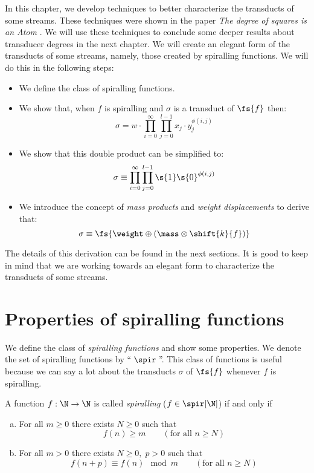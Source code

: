 
In this chapter, we develop techniques to better characterize the transducts of some streams. These techniques were shown in the paper \textit{The degree of squares is an Atom} \cite{streams:degrees:squares:2015}. We will use these techniques to conclude some deeper results about transducer degrees in the next chapter. We will create an elegant form of the transducts of some streams, namely, those created by spiralling functions. We will do this in the following steps:
\begin{itemize}
	\item We define the class of spiralling functions.
	\item We show that, when $f$ is spiralling and $\sigma$ is a transduct of $\fs{f}$ then:
	$$\sigma = w\cdot \prod_{i=0}^{\infty}\prod_{j=0}^{l-1} x_j \cdot y_j^{\phi(i,j)}$$
	\item We show that this double product can be simplified to:
	$$\sigma \equiv \prod_{i=0}^{\infty}\prod_{j=0}^{l-1} \s{1}\s{0}^{\phi(i,j)}$$
	\item We introduce the concept of \textit{mass products} and \textit{weight displacements} to derive that:
	$$\sigma \equiv \fs{\weight\oplus(\mass\otimes \shift{k}{f})}$$
\end{itemize}

The details of this derivation can be found in the next sections. It is good to keep in mind that we are working towards an elegant form to characterize the transducts of some streams.

\section{Properties of spiralling functions}
We define the class of \textit{spiralling functions} and show some properties. We denote the set of spiralling functions by ``$\;\spir\;$''. This class of functions is useful because we can say a lot about the transducts $\sigma$ of $\fs{f}$ whenever $f$ is spiralling. 

\begin{definition}\label{def_spir}
	A function $f: \N \to \N$ is called \textit{spiralling} ($f \in \spir[\N]$) if and only if
	\begin{enumerate}[(a)]
		\item For all $m\geq0$ there exists $N\geq 0$ such that
		$$f(n)\geq m \qquad (\text{for all } n\geq N)$$
		\label{def_spir.lim}
		\item For all $m>0$ there exists $N\geq0,\;p>0$ such that
		$$f(n+p) \equiv f(n) \mod m \qquad (\text{for all } n\geq N)$$
		\label{def_spir.per}
	\end{enumerate}
\end{definition}

